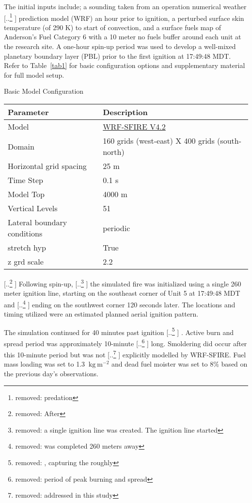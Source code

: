 \documentclass[preprints,article,accept,moreauthors,pdftex]{Definitions/mdpi}
\providecommand{\DIFadd}[1]{{\protect\color{blue} \sf #1}} %
\providecommand{\DIFdel}[1]{{\protect\color{red} [..\footnote{removed: #1} ]}} %
\providecommand{\DIFaddbegin}{} %
\providecommand{\DIFaddend}{} %
\providecommand{\DIFdelbegin}{} %
\providecommand{\DIFdelend}{} %
\begin{document}
The initial inputs include; a sounding taken from an operation numerical weather \DIFdelbegin \DIFdel{predation }\DIFdelend \DIFaddbegin \DIFadd{prediction }\DIFaddend model (WRF) an hour prior to ignition, a perturbed surface skin temperature (of 290 K) to start of convection, and a surface fuels map of Anderson’s Fuel Category 6 with a 10 meter no fuels buffer around each unit at the research site. A one-hour spin-up period was used to develop a well-mixed planetary boundary layer (PBL) prior to the first ignition at 17:49:48 MDT. Refer to Table~\ref{tab1} for basic configuration options and supplementary material for full model setup.

\begin{specialtable}[H]
  \centering
  \caption{Basic Model Configuration\label{tab1}}
  \begin{tabular}{ll}
  \toprule
  \textbf{Parameter}	& \textbf{Description}\\
  \midrule
   Model		& \href{https://github.com/openwfm/WRF-SFIRE/tree/a2c3118f08ce424885705e9155b127ea28879f8b}{WRF-SFIRE V4.2}\\
   Domain		& 160 grids (west-east) X 400 grids (south-north)\\
   Horizontal grid spacing		& 25 m\\
   Time Step	& 0.1 s\\
   Model Top		& 4000 m\\
   Vertical Levels		& 51\\
   Lateral boundary conditions	& periodic\\
   stretch hyp & True\\
   z grd scale & 2.2\\
  \bottomrule
  \end{tabular}
  \end{specialtable}

\DIFdelbegin \DIFdel{After }\DIFdelend \DIFaddbegin \DIFadd{Following }\DIFaddend spin-up, \DIFdelbegin \DIFdel{a single ignition line was created. The ignition line started }\DIFdelend \DIFaddbegin \DIFadd{the simulated fire was initialized using a single 260 meter ignition line, starting }\DIFaddend on the southeast corner of Unit 5 at 17:49:48 MDT and \DIFdelbegin \DIFdel{was completed 260 meters away }\DIFdelend \DIFaddbegin \DIFadd{ending }\DIFaddend on the southwest corner 120 seconds later. The locations and timing utilized were an estimated planned aerial ignition pattern.

The simulation continued for 40 minutes past ignition\DIFdelbegin \DIFdel{, capturing the roughly }\DIFdelend \DIFaddbegin \DIFadd{. Active burn and spread period was approximately }\DIFaddend 10-minute \DIFdelbegin \DIFdel{period of peak burning and spread }\DIFdelend \DIFaddbegin \DIFadd{long}\DIFaddend . Smoldering did occur after this 10-minute period but was not \DIFdelbegin \DIFdel{addressed in this study}\DIFdelend \DIFaddbegin \DIFadd{explicitly modelled by WRF-SFIRE}\DIFaddend . Fuel mass loading was set to 1.3 $\mathrm{~kg}\mathrm{~m}^{-2}$ and dead fuel moister was set to 8$\%$ based on the previous day’s observations.
\end{document}
